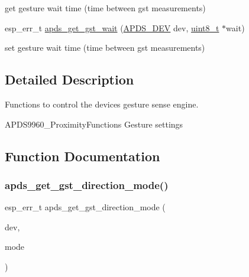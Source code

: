 \begin{DoxyCompactItemize}
\begin{DoxyCompactList}
\begin{DoxyItemize}
\item get gesture wait time (time between gst measurements) 
\end{DoxyItemize}\end{DoxyCompactList}\item 
esp\+\_\+err\+\_\+t \hyperlink{group__APDS9960__GestureFunctions_ga7276489ee5a7a166406301104a53251a}{apds\+\_\+get\+\_\+gst\+\_\+wait} (\hyperlink{structAPDS9960__Driver}{A\+P\+D\+S\+\_\+\+D\+EV} dev, \hyperlink{vl53l0x__types_8h_aba7bc1797add20fe3efdf37ced1182c5}{uint8\+\_\+t} $\ast$wait)
\begin{DoxyCompactList}\small\item\em 
\begin{DoxyItemize}
\item set gesture wait time (time between gst measurements) 
\end{DoxyItemize}\end{DoxyCompactList}\end{DoxyCompactItemize}


\subsection{Detailed Description}
Functions to control the device\textquotesingle{}s gesture sense engine. 

A\+P\+D\+S9960\+\_\+\+Proximity\+Functions Gesture settings 

\subsection{Function Documentation}
\mbox{\label{group__APDS9960__GestureFunctions_ga4f70f2fb9265196987c8dfabec6bc187}} 
\subsubsection{\texorpdfstring{apds\+\_\+get\+\_\+gst\+\_\+direction\+\_\+mode()}{apds\_get\_gst\_direction\_mode()}}
{\footnotesize\ttfamily esp\+\_\+err\+\_\+t apds\+\_\+get\+\_\+gst\+\_\+direction\+\_\+mode (\begin{DoxyParamCaption}\item[{\hyperlink{structAPDS9960__Driver}{A\+P\+D\+S\+\_\+\+D\+EV}}]{dev,  }\item[{\hyperlink{vl53l0x__types_8h_aba7bc1797add20fe3efdf37ced1182c5}{uint8\+\_\+t} $\ast$}]{mode }\end{DoxyParamCaption})}




